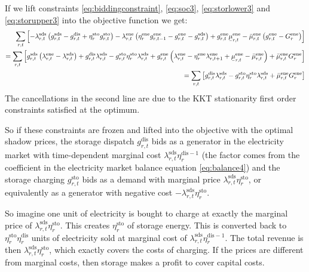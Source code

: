 \documentclass[final,3p,times]{elsarticle}
\begin{document}
If we lift constraints \eqref{eq:biddingconstraint}, \eqref{eq:soc3},
\eqref{eq:storlower3} and \eqref{eq:storupper3} into the objective function we
get:
\begin{align}
  \sum_{r,t} \left[ - \lambda^{\textrm{sds}}_{r,t} \left(  g^{\textrm{sds}}_{r,t} - g^{\textrm{dis}}_{r,t} + \eta^{\textrm{sto}}_r g^{\textrm{sto}}_{r,t}\right) - \lambda^{\textrm{ene}}_{r,t} \left(\eta^{\textrm{ene}}_r g^{\textrm{ene}}_{r,t-1} - g^{\textrm{ene}}_{r,t} - g^{\textrm{sds}}_{r,t}\right)  + g^{\textrm{ene}}_{r,t}\ubar{\mu}^{\textrm{ene}}_{r,t} -  \bar{\mu}^{\textrm{ene}}_{r,t}  \left(    g^{\textrm{ene}}_{r,t} - G^{\textrm{ene}}_r \right) \right]                                        \\
  =   \sum_{r,t} \left[  g^{\textrm{sds}}_{r,t} \left(\lambda^{\textrm{ene}}_{r,t} - \lambda^{\textrm{sds}}_{r,t} \right)  +g^{\textrm{dis}}_{r,t}\lambda^{\textrm{sds}}_{r,t}  -  g^{\textrm{sto}}_{r,t} \eta^{\textrm{sto}}_r \lambda^{\textrm{sds}}_{r,t} + g^{\textrm{ene}}_{r,t}\left(\lambda^{\textrm{ene}}_{r,t} -\eta^{\textrm{ene}}_r \lambda^{\textrm{ene}}_{r,t+1}  + \ubar{\mu}^{\textrm{ene}}_{r,t} -  \bar{\mu}^{\textrm{ene}}_{r,t} \right) + \bar{\mu}^{\textrm{ene}}_{r,t} G^{\textrm{ene}}_r \right] \\
  =   \sum_{r,t} \left[ g^{\textrm{dis}}_{r,t}\lambda^{\textrm{sds}}_{r,t}  -  g^{\textrm{sto}}_{r,t} \eta^{\textrm{sto}}_r \lambda^{\textrm{sds}}_{r,t} + \bar{\mu}^{\textrm{ene}}_{r,t} G^{\textrm{ene}}_r \right]
\end{align}
The cancellations in the second line are due to the KKT stationarity first order
constraints satisfied at the optimum.

So if these constraints are frozen and lifted into the objective with the
optimal shadow prices, the storage dispatch $g^{\textrm{dis}}_{r,t}$ bids as a
generator in the electricity market with time-dependent marginal cost
$\lambda^{\textrm{sds}}_{r,t}\eta^{\textrm{dis} -1}_r $ (the factor comes from
the coefficient in the electricity market balance equation \eqref{eq:balance4})
and the storage charging $g^{\textrm{sto}}_{r,t}$ bids as a demand with marginal
price $\lambda^{\textrm{sds}}_{r,t} \eta^{\textrm{sto}}_r$, or equivalently as a
generator with negative cost $-\lambda^{\textrm{sds}}_{r,t}
\eta^{\textrm{sto}}_r$.

So imagine one unit of electricity is bought to charge at exactly the marginal
price of $\lambda^{\textrm{sds}}_{r,t} \eta^{\textrm{sto}}_r$. This creates
$\eta^{\textrm{sto}}_r$ of storage energy. This is converted back to
$\eta^{\textrm{sto}}_r\eta^{\textrm{dis}}_r$ units of electricity sold at
marginal cost of $\lambda^{\textrm{sds}}_{r,t}\eta^{\textrm{dis}-1}_r $. The
total revenue is then $\lambda^{\textrm{sds}}_{r,t} \eta^{\textrm{sto}}_r$,
which exactly covers the costs of charging. If the prices are different from
marginal costs, then storage makes a profit to cover capital costs.
\end{document}
